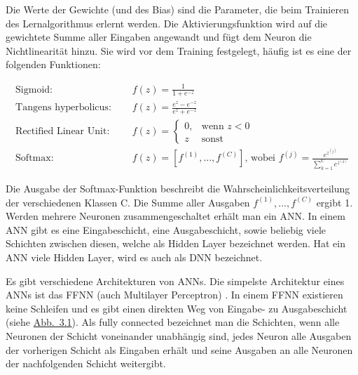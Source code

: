 Die Werte der Gewichte (und des Bias) sind die Parameter, die beim Trainieren des Lernalgorithmus erlernt werden. Die Aktivierungsfunktion wird auf die gewichtete Summe aller Eingaben angewandt und fügt dem Neuron die Nichtlinearität hinzu. Sie wird vor dem Training festgelegt, häufig ist es eine der folgenden Funktionen:


\begin{align}
\label{sigmoid}
\text{Sigmoid: } &\quad f(z) = \frac{1}{1+e^{-z}} \\[1em]
\label{tanh}
\text{Tangens hyperbolicus: } &\quad f(z) = \frac{e^z - e^{-z}}{e^z + e^{-z}} \\[1em]
\label{relu}
\text{Rectified Linear Unit: } &\quad f(z) = 
\begin{cases} 
0, & \text{wenn } z < 0 \\ 
z & \text{sonst}
\end{cases}
\\[1em]
\label{softmax}
\text{Softmax: } &\quad f(z) = [f^{(1)},...,f^{(C)}]\text{, wobei } f^{(j)} = \frac{e^{z^{(j)}}}{\sum_{k=1}^C e^{z^{(k)}}}
\end{align}

Die Ausgabe der Softmax-Funktion beschreibt die Wahrscheinlichkeitsverteilung der verschiedenen Klassen C. Die Summe aller Ausgaben $f^{(1)},...,f^{(C)}$ ergibt 1.  Werden mehrere Neuronen zusammengeschaltet erhält man ein \gls{ANN}. In einem \gls{ANN} gibt es eine Eingabeschicht, eine Ausgabeschicht, sowie beliebig viele Schichten zwischen diesen, welche als Hidden Layer bezeichnet werden. Hat ein \gls{ANN} viele Hidden Layer, wird es auch als \gls{DNN} bezeichnet. \cite{burkov_machine_2019}

Es gibt verschiedene Architekturen von \glspl{ANN}. Die simpelste Architektur eines \glspl{ANN} ist das \gls{FFNN} (auch Multilayer Perceptron) \cite{murphy_probabilistic_2022}. In einem \gls{FFNN} existieren keine Schleifen und es gibt einen direkten Weg von Eingabe- zu Ausgabeschicht (siehe \hyperref[fig:ANN]{Abb.~3.1}). Als fully connected bezeichnet man die Schichten, wenn alle Neuronen der Schicht voneinander unabhängig sind, jedes Neuron alle Ausgaben der vorherigen Schicht als Eingaben erhält und seine Ausgaben an alle Neuronen der nachfolgenden Schicht weitergibt. \cite{nielsen_neural_2015}



